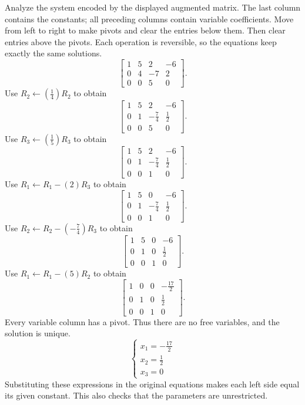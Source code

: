 \goal Analyze the system encoded by the displayed augmented matrix. The last column contains the constants; all preceding columns contain variable coefficients.
\idea Move from left to right to make pivots and clear the entries below them. Then clear entries above the pivots. Each operation is reversible, so the equations keep exactly the same solutions.
\[ \left[\begin{array}{rrr|r}1&5&2&-6\\0&4&-7&2\\0&0&5&0\end{array}\right].\]
Use $R_{2}\leftarrow(\frac{1}{4})R_{2}$ to obtain
\[ \left[\begin{array}{rrr|r}1&5&2&-6\\0&1&- \frac{7}{4}&\frac{1}{2}\\0&0&5&0\end{array}\right].\]
Use $R_{3}\leftarrow(\frac{1}{5})R_{3}$ to obtain
\[ \left[\begin{array}{rrr|r}1&5&2&-6\\0&1&- \frac{7}{4}&\frac{1}{2}\\0&0&1&0\end{array}\right].\]
Use $R_{1}\leftarrow R_{1}-(2)R_{3}$ to obtain
\[ \left[\begin{array}{rrr|r}1&5&0&-6\\0&1&- \frac{7}{4}&\frac{1}{2}\\0&0&1&0\end{array}\right].\]
Use $R_{2}\leftarrow R_{2}-(- \frac{7}{4})R_{3}$ to obtain
\[ \left[\begin{array}{rrr|r}1&5&0&-6\\0&1&0&\frac{1}{2}\\0&0&1&0\end{array}\right].\]
Use $R_{1}\leftarrow R_{1}-(5)R_{2}$ to obtain
\[ \left[\begin{array}{rrr|r}1&0&0&- \frac{17}{2}\\0&1&0&\frac{1}{2}\\0&0&1&0\end{array}\right].\]
Every variable column has a pivot. Thus there are no free variables, and the solution is unique.
\[ \begin{cases}x_{1}=- \frac{17}{2}\\x_{2}=\frac{1}{2}\\x_{3}=0\end{cases}\]
Substituting these expressions in the original equations makes each left side equal its given constant. This also checks that the parameters are unrestricted.

